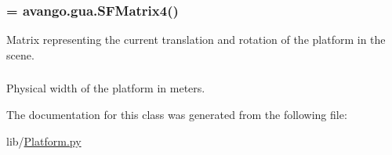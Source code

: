 \hypertarget{classlib_1_1Platform_1_1Platform_ab8bf653beb33de70371ae6984aeb516c}{
\subsubsection[{sf\-\_\-abs\-\_\-mat}]{ = avango.\-gua.\-S\-F\-Matrix4()}}\label{classlib_1_1Platform_1_1Platform_ab8bf653beb33de70371ae6984aeb516c}


\-Matrix representing the current translation and rotation of the platform in the scene. 

\hypertarget{classlib_1_1Platform_1_1Platform_a392651bfee95e64e072230754d4c9083}{
\subsubsection[{width}]{}}\label{classlib_1_1Platform_1_1Platform_a392651bfee95e64e072230754d4c9083}


\-Physical width of the platform in meters. 



\-The documentation for this class was generated from the following file\-:\begin{DoxyCompactItemize}
\item 
lib/\hyperlink{Platform_8py}{\-Platform.\-py}\end{DoxyCompactItemize}
